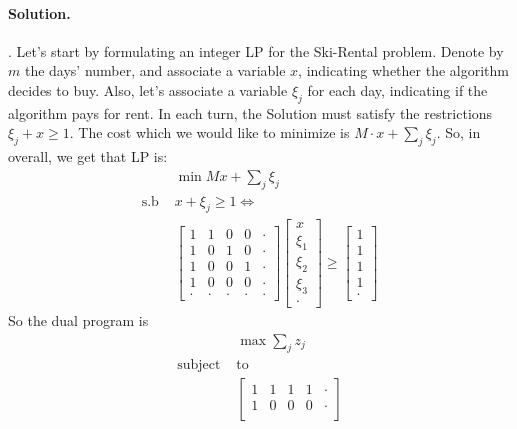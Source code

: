 \documentclass{article}
\begin{document}
\begin{multicols*}{2}
  \paragraph{Solution.}. Let's start by formulating an integer LP for the Ski-Rental problem. Denote by $m$ the days' number, and associate a variable $x$, indicating whether the algorithm decides to buy. Also, let's associate a variable $\xi_{j}$ for each day, indicating if the algorithm pays for rent. In each turn, the Solution must satisfy the restrictions $ \xi_{j} + x  \ge 1$. The cost which we would like to minimize is $ M\cdot x + \sum_{j}{\xi_{j}}$. So, in overall, we get that LP is:    
  \begin{equation*}
    \begin{split}
      & \min{ Mx + \sum_{j}{\xi_{j}}} \\
      \text{s.b } & x + \xi_{j} \ge 1 \Leftrightarrow \\ 
      & \begin{bmatrix}
	1 & 1 & 0 & 0 & \cdot\\
	1 & 0 & 1 & 0 & \cdot\\
	1 & 0 & 0 & 1 & \cdot\\
	1 & 0 & 0 & 0 & \cdot\\
	\cdot & \cdot & \cdot & \cdot & \cdot
      \end{bmatrix} 
      \begin{bmatrix}
	x \\
	\xi_{1} \\ 
	\xi_{2} \\
	\xi_{3} \\
	\cdot 
      \end{bmatrix} \ge
      \begin{bmatrix}
	1 \\
	1 \\ 
	1 \\
	1 \\
	\cdot 
      \end{bmatrix}
    \end{split}
  \end{equation*}
  So the dual program is 
  \begin{equation*}
    \begin{split}
      & \max{ \sum_{j}{z_{j}}} \\
      \text{subject } &  \text{to}  \\ 
      & \begin{bmatrix}
	1 & 1 & 1 & 1 & \cdot \\
	1 & 0 & 0 & 0 & \cdot \\

\end{bmatrix}
\end{split}
\end{equation*}
\end{multicols*}
\end{document}
